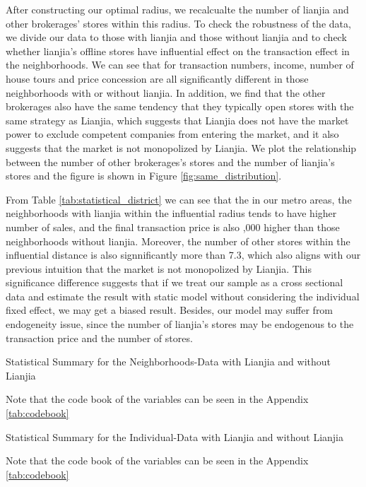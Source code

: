 \documentclass[11pt]{article}
\begin{document}
After constructing our optimal radius, we recalcualte the number of lianjia and other brokerages' stores within this radius. To check the robustness of the data, we divide our data to those with lianjia and those without lianjia and to check whether lianjia's offline stores have influential effect on the transaction effect in the neighborhoods. We can see that for transaction numbers, income, number of house tours and price concession are all significantly different in those neighborhoods with or without lianjia. In addition, we find that the other brokerages also have the same tendency that they typically open stores with the same strategy as Lianjia, which suggests that Lianjia does not have the market power to exclude competent companies from entering the market, and it also suggests that the market is not monopolized by Lianjia. We plot the relationship between the number of other brokerages's stores and the number of lianjia's stores and the figure is shown in Figure \ref{fig:same_distribution}.

From Table \ref{tab:statistical_district} we can see that the in our metro areas, the neighborhoods with lianjia within the influential radius tends to have higher number of sales, and the final transaction price is also ,000 higher than those neighborhoods without lianjia. Moreover, the number of other stores within the influential distance is also signnificantly more than 7.3, which also aligns with our previous intuition that the market is not monopolized by Lianjia. This significance difference suggests that if we treat our sample as a cross sectional data and estimate the result with static model without considering the individual fixed effect, we may get a biased result. Besides, our model may suffer from endogeneity issue, since the number of lianjia's stores may be endogenous to the transaction price and the number of stores. 

\begin{table}[htb!]
    \centering
    \begin{tiny}
    \caption{Statistical Summary for the Neighborhoods-Data with Lianjia and without Lianjia}
    
    \label{tab:statistical_district}

    Note that the code book of the variables can be seen in the Appendix \ref{tab:codebook}
    \end{tiny}
\end{table}

\begin{table}[htb!]
  \centering
  \begin{tiny}
  \caption{Statistical Summary for the Individual-Data with Lianjia and without Lianjia}
  
  \label{tab:statistical_individual}

  Note that the code book of the variables can be seen in the Appendix \ref{tab:codebook}
  \end{tiny}  
\end{table}
\end{document}
